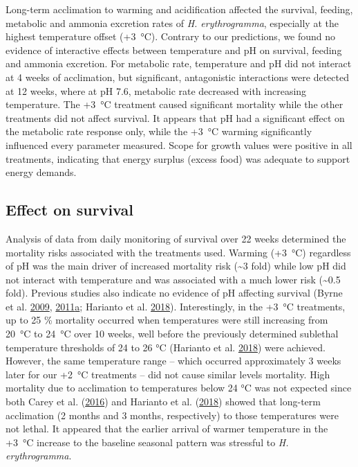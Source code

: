 \documentclass[a4paper,10pt, oneside]{memoir}
\begin{document}
Long-term acclimation to warming and acidification affected the survival, feeding, metabolic and ammonia excretion rates of \textit{H. erythrogramma}, especially at the highest temperature offset (+\SI{3}{\celsius}).
Contrary to our predictions, we found no evidence of interactive effects between temperature and pH on survival, feeding and ammonia excretion.
For metabolic rate, temperature and pH did not interact at 4 weeks of acclimation, but significant, antagonistic interactions were detected at 12 weeks, where at pH 7.6, metabolic rate decreased with increasing temperature.
The +\SI{3}{\celsius} treatment caused significant mortality while the other treatments did not affect survival.
It appears that pH had a significant effect on the metabolic rate response only, while the +\SI{3}{\celsius} warming significantly influenced every parameter measured. Scope for growth values were positive in all treatments, indicating that energy surplus (excess food) was adequate to support energy demands.

\hypertarget{effect-on-survival}{%
\subsection{Effect on survival}\label{effect-on-survival}}

Analysis of data from daily monitoring of survival over 22 weeks determined the mortality risks associated with the treatments used.
Warming (+\SI{3}{\celsius}) regardless of pH was the main driver of increased mortality risk (\si{\sim}3 fold) while low pH did not interact with temperature and was associated with a much lower risk (\si{\sim}0.5 fold).
Previous studies also indicate no evidence of pH affecting survival (Byrne et al. \protect\hyperlink{ref-Byrne2009}{2009}, \protect\hyperlink{ref-Byrne2011}{2011}\protect\hyperlink{ref-Byrne2011}{a}; Harianto et al. \protect\hyperlink{ref-Harianto2018}{2018}).
Interestingly, in the +\SI{3}{\celsius} treatments, up to 25 \% mortality occurred when temperatures were still increasing from \SI{20}{\celsius} to \SI{24}{\celsius} over 10 weeks, well before the previously determined sublethal temperature thresholds of 24 to 26 \si{\celsius} (Harianto et al. \protect\hyperlink{ref-Harianto2018}{2018}) were achieved.
However, the same temperature range -- which occurred approximately 3 weeks later for our +\SI{2}{\celsius} treatments -- did not cause similar levels mortality.
High mortality due to acclimation to temperatures below 24 \si{\celsius} was not expected since both Carey et al. (\protect\hyperlink{ref-Carey2016}{2016}) and Harianto et al. (\protect\hyperlink{ref-Harianto2018}{2018}) showed that long-term acclimation (2 months and 3 months, respectively) to those temperatures were not lethal.
It appeared that the earlier arrival of warmer temperature in the +\SI{3}{\celsius} increase to the baseline seasonal pattern was stressful to \textit{H. erythrogramma}.
\end{document}
